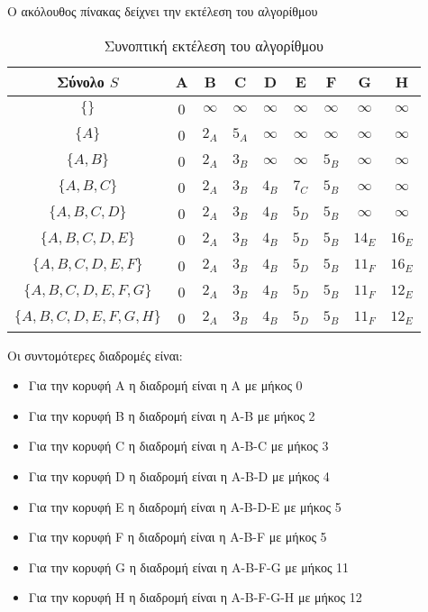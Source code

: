 Ο ακόλουθος πίνακας δείχνει την εκτέλεση του αλγορίθμου
\begin{table}[ht!]
	\centering
	\label{tbl:dijkstra3}
	\begin{tabular}{|c|c|c|c|c|c|c|c|c|}
		\hline
		Σύνολο $S$            & A & B        & C        & D        & E        & F        & G        & H         \\ \hline
		$\{\}$                & 0 & $\infty$ & $\infty$ & $\infty$ & $\infty$ & $\infty$ & $\infty$ & $\infty$  \\ \hline
		$\{A\}$               & 0 & $2_A$    & $5_A$    & $\infty$ & $\infty$ & $\infty$ & $\infty$ & $\infty$  \\ \hline
		$\{A,B\}$             & 0 & $2_A$    & $3_B$    & $\infty$ & $\infty$ & $5_B$    & $\infty$ & $\infty$  \\ \hline
		$\{A,B,C\}$           & 0 & $2_A$    & $3_B$    & $4_B$    & $7_C$    & $5_B$    & $\infty$ & $\infty$  \\ \hline
		$\{A,B,C,D\}$         & 0 & $2_A$    & $3_B$    & $4_B$    & $5_D$    & $5_B$    & $\infty$ & $\infty$  \\ \hline
		$\{A,B,C,D,E\}$       & 0 & $2_A$    & $3_B$    & $4_B$    & $5_D$    & $5_B$    & $14_E$   & $16_E$    \\ \hline			
		$\{A,B,C,D,E,F\}$     & 0 & $2_A$    & $3_B$    & $4_B$    & $5_D$    & $5_B$    & $11_F$   & $16_E$    \\ \hline			
		$\{A,B,C,D,E,F,G\}$    & 0 & $2_A$    & $3_B$    & $4_B$    & $5_D$    & $5_B$    & $11_F$   & $12_E$    \\ \hline			
		$\{A,B,C,D,E,F,G,H\}$ & 0 & $2_A$    & $3_B$    & $4_B$    & $5_D$    & $5_B$    & $11_F$   & $12_E$    \\ \hline
	\end{tabular}
	\caption{Συνοπτική εκτέλεση του αλγορίθμου}
\end{table}


Οι συντομότερες διαδρομές είναι:
\begin{itemize}[noitemsep]
\item Για την κορυφή A η διαδρομή είναι η A με μήκος 0
\item Για την κορυφή B η διαδρομή είναι η A-B με μήκος 2
\item Για την κορυφή C η διαδρομή είναι η A-B-C με μήκος 3
\item Για την κορυφή D η διαδρομή είναι η A-B-D με μήκος 4
\item Για την κορυφή E η διαδρομή είναι η A-B-D-E με μήκος 5
\item Για την κορυφή F η διαδρομή είναι η A-B-F με μήκος 5
\item Για την κορυφή G η διαδρομή είναι η A-B-F-G με μήκος 11
\item Για την κορυφή H η διαδρομή είναι η A-B-F-G-H με μήκος 12
\end{itemize}

